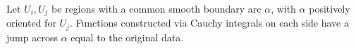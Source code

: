 
Let $U_i, U_j$ be regions with a common smooth boundary arc $\alpha$, with $\alpha$ positively oriented for $U_j$. Functions constructed via Cauchy integrals on each side have a jump across $\alpha$ equal to the original data.
